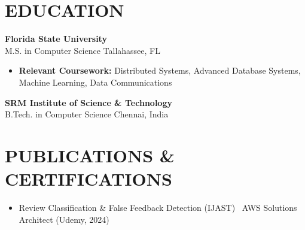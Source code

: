 \documentclass[letterpaper,10pt]{article}
\newcommand{\resumeItem}[1]{\item\small #1}
\newcommand{\resumeSubheading}[4]{
  \vspace{6pt}
  \noindent
  \textbf{#1} \hfill {\footnotesize #2} \\
  [-1pt]
  \noindent
  \small #3 \hfill {\small #4}
  \vspace{3pt}
}
\newcommand{\resumeItemsStart}{\vspace{-2pt}\begin{itemize}}
\newcommand{\resumeItemsEnd}{\end{itemize}\vspace{6pt}}
\begin{document}
\section{\textcolor{metablue}{EDUCATION}}
\vspace{-10pt}
\resumeSubheading
{Florida State University}{}
{M.S. in Computer Science}{Tallahassee, FL}
\resumeItemsStart
\resumeItem{\textbf{Relevant Coursework:} Distributed Systems, Advanced Database Systems, Machine Learning, Data Communications}
\resumeItemsEnd
\vspace{-5pt}
\resumeSubheading
{SRM Institute of Science \& Technology}{}
{B.Tech. in Computer Science}{Chennai, India}
\vspace{-10pt}

\section{\textcolor{metablue}{PUBLICATIONS \& CERTIFICATIONS}}
\vspace{-5pt}
\begin{itemize}
\resumeItem{Review Classification \& False Feedback Detection (IJAST) \textbar\ AWS Solutions Architect (Udemy, 2024)}
\end{itemize}
\end{document}

